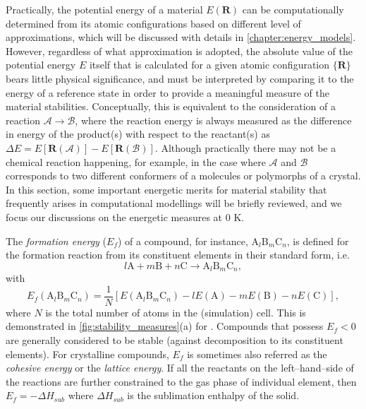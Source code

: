Practically, the potential energy of a material $E(\bm{R})$  can be computationally determined from its atomic configurations based on different level of approximations, which will be  discussed with details in \cref{chapter:energy_models}. However, regardless of what approximation is adopted,  the absolute value of the potential energy $E$ itself that is calculated for a given atomic configuration $\{\bm{R}\}$ bears little physical significance, and must be interpreted by comparing it to the energy of a reference state in order to provide a meaningful measure of the material stabilities. Conceptually, this is equivalent to the consideration of a  reaction $\mathcal{A}\to\mathcal{B}$, where the reaction energy is always measured as the difference in energy of the product(s) with respect to the reactant(s) as $\Delta E=E[\bm{R}(\mathcal{A})]-E[\bm{R}(\mathcal{B})]$. Although practically there may not be a chemical reaction happening, for example, in the case where $\mathcal{A}$  and  $\mathcal{B}$  corresponds to two different conformers of a molecules  or polymorphs of a crystal.  In this section, some important energetic  merits for material stability that frequently arises in computational modellings will be briefly reviewed, and we focus our discussions on the energetic measures at 0 K. 

The \textit{formation energy} ($E_f$) of a compound, for instance, A$_l$B$_m$C$_n$, is defined for the formation reaction from its constituent elements in their standard form, i.e.
\begin{equation}\label{eq:formation_chemical_reaction}
    l\mbox{A}+m\mbox{B}+n\mbox{C}\to \mbox{A}_l\mbox{B}_m\mbox{C}_n,
\end{equation}
with 
\begin{equation}\label{eq:formation_energy}
    E_{f}\left(\mbox{A}_l\mbox{B}_m\mbox{C}_n\right)=\frac{1}{N}\left[E\left(\mbox{A}_l\mbox{B}_m\mbox{C}_n\right)-lE(\mbox{A})-mE(\mbox{B})-nE(\mbox{C})\right],
\end{equation}
where $N$ is the total number of atoms in the (simulation) cell. This is demonstrated in \cref{fig:stability_measures}(a) for .  Compounds that possess $E_f<0$ are generally considered to be stable (against decomposition to its constituent elements). For crystalline compounds, $E_f$ is sometimes also referred as the \textit{cohesive energy} or the \textit{lattice energy}. If all the reactants on the left--hand--side of the reactions are further constrained to the gas phase of individual element, then $E_f=-\Delta H_{sub}$ where $\Delta H_{sub}$ is the sublimation enthalpy of the solid. 

